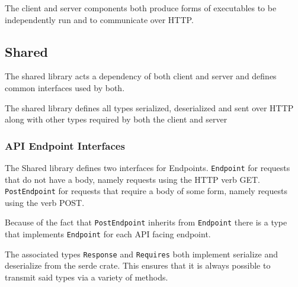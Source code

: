 \documentclass{article}
\begin{document}
The client and server components both produce forms of executables to be independently run and to communicate over HTTP.

\subsection{Shared}

The shared library acts a dependency of both client and server and defines common interfaces used by both.

The shared library defines all types serialized, deserialized and sent over HTTP along with other types required by both the client and server

\subsubsection{API Endpoint Interfaces}

The Shared library defines two interfaces for Endpoints.
\texttt{Endpoint} for requests that do not have a body, namely requests using the HTTP verb GET.
\texttt{PostEndpoint} for requests that require a body of some form, namely requests using the verb POST.

Because of the fact that \texttt{PostEndpoint} inherits from \texttt{Endpoint} there is a type that implements \texttt{Endpoint} for each API facing endpoint.

The associated types \texttt{Response} and \texttt{Requires} both implement serialize and deserialize from the serde crate.
This ensures that it is always possible to transmit said types via a variety of methods.

\begin{center}
\end{center}
\end{document}
